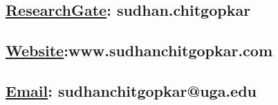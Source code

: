 \documentclass[11pt]{article}
\begin{document}
\subsection{\href{http://research.sudhanchitgopkar.com}{ResearchGate}: sudhan.chitgopkar}
\label{sec:org31813c1}
\subsection{\href{http://sudhanchitgopkar.com}{Website}:www.sudhanchitgopkar.com}
\label{sec:org1e0b055}
\subsection{\href{mailto:ssc10661@uga.edu}{Email}: sudhanchitgopkar@uga.edu}
\label{sec:orgaedc738}
\end{document}
